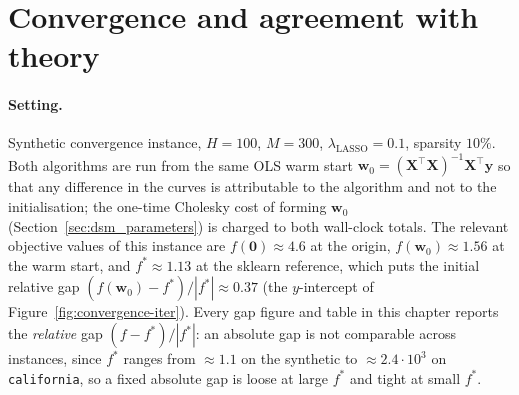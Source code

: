 \section{Convergence and agreement with theory}
\label{sec:convergence}

\paragraph{Setting.}
Synthetic convergence instance, $H=100$, $M=300$,
$\lambda_\text{LASSO}=0.1$, sparsity $10\%$. Both algorithms are run from
the same OLS warm start
$\mathbf{w}_{0}=(\mathbf{X}^{\top}\mathbf{X})^{-1}\mathbf{X}^{\top}\mathbf{y}$
so that any difference in the curves is attributable to the algorithm and
not to the initialisation; the one-time Cholesky cost of forming
$\mathbf{w}_{0}$ (Section~\ref{sec:dsm_parameters}) is charged to both
wall-clock totals. The relevant objective values of this instance are
$f(\mathbf{0})\approx 4.6$ at the origin, $f(\mathbf{w}_{0})\approx 1.56$
at the warm start, and $f^{*}\approx 1.13$ at the sklearn reference,
which puts the initial relative gap
$(f(\mathbf{w}_{0})-f^{*})/|f^{*}|\approx 0.37$ (the $y$-intercept of
Figure~\ref{fig:convergence-iter}). Every gap figure and table in this
chapter reports the \emph{relative} gap $(f-f^{*})/|f^{*}|$: an absolute
gap is not comparable across instances, since $f^{*}$ ranges from
$\approx 1.1$ on the synthetic to $\approx 2.4\cdot 10^{3}$ on
\texttt{california}, so a fixed absolute gap is loose at large $f^{*}$ and
tight at small $f^{*}$.

